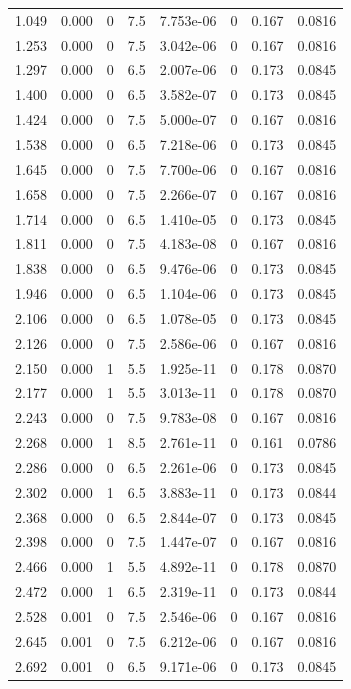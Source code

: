\documentclass[preview]{standalone}
\begin{document}
{{\begin{tabular}{L{1.2cm}C{1.2cm} C{0.3cm}C{0.5cm} C{1.4cm}C{1.4cm} C{1.4cm}C{1.4cm}}
  1.049  &  0.000  & 0     & 7.5 &  7.753e-06  & 0  & 0.167 &  0.0816   \\ 
  1.253  &  0.000  & 0     & 7.5 &  3.042e-06  & 0  & 0.167 &  0.0816   \\ 
  1.297  &  0.000  & 0     & 6.5 &  2.007e-06  & 0  & 0.173 &  0.0845   \\ 
  1.400  &  0.000  & 0     & 6.5 &  3.582e-07  & 0  & 0.173 &  0.0845   \\ 
  1.424  &  0.000  & 0     & 7.5 &  5.000e-07  & 0  & 0.167 &  0.0816   \\ 
  1.538  &  0.000  & 0     & 6.5 &  7.218e-06  & 0  & 0.173 &  0.0845   \\ 
  1.645  &  0.000  & 0     & 7.5 &  7.700e-06  & 0  & 0.167 &  0.0816   \\ 
  1.658  &  0.000  & 0     & 7.5 &  2.266e-07  & 0  & 0.167 &  0.0816   \\ 
  1.714  &  0.000  & 0     & 6.5 &  1.410e-05  & 0  & 0.173 &  0.0845   \\ 
  1.811  &  0.000  & 0     & 7.5 &  4.183e-08  & 0  & 0.167 &  0.0816   \\ 
  1.838  &  0.000  & 0     & 6.5 &  9.476e-06  & 0  & 0.173 &  0.0845   \\ 
  1.946  &  0.000  & 0     & 6.5 &  1.104e-06  & 0  & 0.173 &  0.0845   \\ 
  2.106  &  0.000  & 0     & 6.5 &  1.078e-05  & 0  & 0.173 &  0.0845   \\ 
  2.126  &  0.000  & 0     & 7.5 &  2.586e-06  & 0  & 0.167 &  0.0816   \\ 
  2.150  &  0.000  & 1     & 5.5 &  1.925e-11  & 0  & 0.178 &  0.0870   \\ 
  2.177  &  0.000  & 1     & 5.5 &  3.013e-11  & 0  & 0.178 &  0.0870   \\ 
  2.243  &  0.000  & 0     & 7.5 &  9.783e-08  & 0  & 0.167 &  0.0816   \\ 
  2.268  &  0.000  & 1     & 8.5 &  2.761e-11  & 0  & 0.161 &  0.0786   \\ 
  2.286  &  0.000  & 0     & 6.5 &  2.261e-06  & 0  & 0.173 &  0.0845   \\ 
  2.302  &  0.000  & 1     & 6.5 &  3.883e-11  & 0  & 0.173 &  0.0844   \\ 
  2.368  &  0.000  & 0     & 6.5 &  2.844e-07  & 0  & 0.173 &  0.0845   \\ 
  2.398  &  0.000  & 0     & 7.5 &  1.447e-07  & 0  & 0.167 &  0.0816   \\ 
  2.466  &  0.000  & 1     & 5.5 &  4.892e-11  & 0  & 0.178 &  0.0870   \\ 
  2.472  &  0.000  & 1     & 6.5 &  2.319e-11  & 0  & 0.173 &  0.0844   \\ 
  2.528  &  0.001  & 0     & 7.5 &  2.546e-06  & 0  & 0.167 &  0.0816   \\ 
  2.645  &  0.001  & 0     & 7.5 &  6.212e-06  & 0  & 0.167 &  0.0816   \\ 
  2.692  &  0.001  & 0     & 6.5 &  9.171e-06  & 0  & 0.173 &  0.0845   \\ 
\hline 
\end{tabular} 

}}
\end{document}
